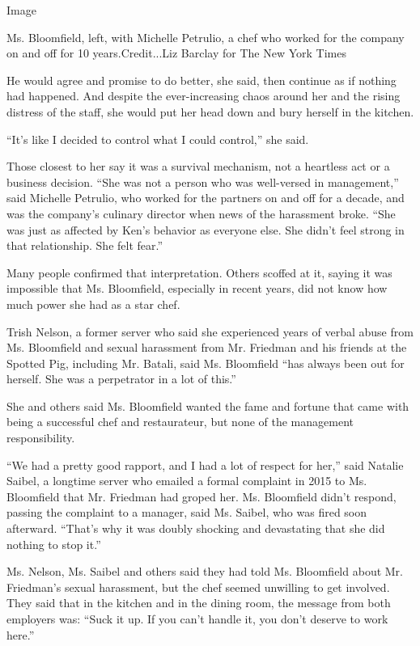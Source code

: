 Image

Ms. Bloomfield, left, with Michelle Petrulio, a chef who worked for the
company on and off for 10 years.Credit...Liz Barclay for The New York
Times

He would agree and promise to do better, she said, then continue as if
nothing had happened. And despite the ever-increasing chaos around her
and the rising distress of the staff, she would put her head down and
bury herself in the kitchen.

``It's like I decided to control what I could control,'' she said.

Those closest to her say it was a survival mechanism, not a heartless
act or a business decision. ``She was not a person who was well-versed
in management,'' said Michelle Petrulio, who worked for the partners on
and off for a decade, and was the company's culinary director when news
of the harassment broke. ``She was just as affected by Ken's behavior as
everyone else. She didn't feel strong in that relationship. She felt
fear.''

Many people confirmed that interpretation. Others scoffed at it, saying
it was impossible that Ms. Bloomfield, especially in recent years, did
not know how much power she had as a star chef.

Trish Nelson, a former server who said she experienced years of verbal
abuse from Ms. Bloomfield and sexual harassment from Mr. Friedman and
his friends at the Spotted Pig, including Mr. Batali, said Ms.
Bloomfield ``has always been out for herself. She was a perpetrator in a
lot of this.''

She and others said Ms. Bloomfield wanted the fame and fortune that came
with being a successful chef and restaurateur, but none of the
management responsibility.

``We had a pretty good rapport, and I had a lot of respect for her,''
said Natalie Saibel, a longtime server who emailed a formal complaint in
2015 to Ms. Bloomfield that Mr. Friedman had groped her. Ms. Bloomfield
didn't respond, passing the complaint to a manager, said Ms. Saibel, who
was fired soon afterward. ``That's why it was doubly shocking and
devastating that she did nothing to stop it.''

Ms. Nelson, Ms. Saibel and others said they had told Ms. Bloomfield
about Mr. Friedman's sexual harassment, but the chef seemed unwilling to
get involved. They said that in the kitchen and in the dining room, the
message from both employers was: ``Suck it up. If you can't handle it,
you don't deserve to work here.''

